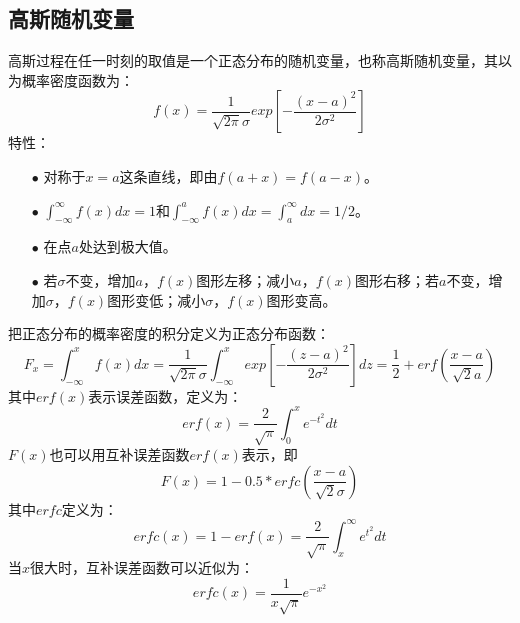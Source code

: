 \documentclass[12pt,a4paper,oneside]{ctexart}
\begin{document}
\subsection{高斯随机变量}
高斯过程在任一时刻的取值是一个正态分布的随机变量，也称高斯随机变量，其以为概率密度函数为：
$$
   f(x) = \frac{1}{\sqrt{2\pi}\sigma}exp\left[-\frac{(x-a)^{2}}{2\sigma^{2}}\right]
$$
特性：
\begin{itemize}
    \item[$\bullet$] 对称于$x=a$这条直线，即由$f(a+x) = f(a-x)$。
    \item[$\bullet$] $\int_{-\infty}^{\infty}f(x)dx = 1$和$\int_{-\infty}^{a}f(x)dx = \int_{a}^{\infty}dx = 1/2$。
    \item[$\bullet$] 在点$a$处达到极大值。
    \item[$\bullet$] 若$\sigma$不变，增加$a$，$f(x)$图形左移；减小$a$，$f(x)$图形右移；若$a$不变，增加$\sigma$，$f(x)$图形变低；减小$\sigma$，$f(x)$图形变高。
\end{itemize}
把正态分布的概率密度的积分定义为正态分布函数：
$$
    F_{x} = \int_{-\infty}^{x}f(x)dx = \frac{1}{\sqrt{2\pi}\sigma}\int_{-\infty}^{x}exp\left[-\frac{(z-a)^{2}}{2\sigma^{2}}\right]dz = \frac{1}{2} + erf(\frac{x-a}{\sqrt{2}a})
$$
其中$erf(x)$表示误差函数，定义为：
$$
    erf(x) = \frac{2}{\sqrt{\pi}}\int_{0}^{x}e^{-t^{2}}dt
$$
$F(x)$也可以用互补误差函数$erf(x)$表示，即
$$
    F(x) = 1-0.5*erfc(\frac{x-a}{\sqrt{2}\sigma})
$$
其中$erfc$定义为：
$$
    erfc(x) = 1 - erf(x) = \frac{2}{\sqrt{\pi}}\int_{x}^{\infty}e^{t^{2}}dt
$$
当$x$很大时，互补误差函数可以近似为：
$$
    erfc(x) = \frac{1}{x\sqrt{\pi}}e^{-x^{2}}
$$
\end{document}
